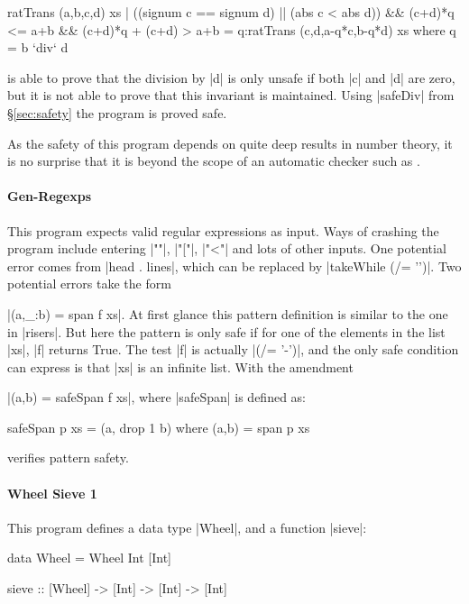 \begin{code}
ratTrans (a,b,c,d) xs |
  ((signum c == signum d) || (abs c < abs d)) &&
  (c+d)*q <= a+b && (c+d)*q + (c+d) > a+b
     = q:ratTrans (c,d,a-q*c,b-q*d) xs
  where q = b `div` d
\end{code}

\noindent \catch{} is able to prove that the division by |d| is only unsafe if both |c| and |d| are zero, but it is not able to prove that this invariant is maintained. Using |safeDiv| from \S\ref{sec:safety} the program is proved safe.

As the safety of this program depends on quite deep results in number theory, it is no surprise that it is beyond the scope of an automatic checker such as \catch{}.

\paragraph{Gen-Regexps}

This program expects valid regular expressions as input. Ways of crashing the program include entering |""|, |"["|, |"<"| and lots of other inputs. One potential error comes from |head . lines|, which can be replaced by |takeWhile (/= '\n')|. Two potential errors take the form \ignore|(a,_:b) = span f xs|. At first glance this pattern definition is similar to the one in |risers|. But here the pattern is only safe if for one of the elements in the list |xs|, |f| returns True. The test |f| is actually |(/= '-')|, and the only safe condition \catch{} can express is that |xs| is an infinite list. With the amendment  \ignore|(a,b) = safeSpan f xs|, where |safeSpan| is defined as:

\begin{code}
safeSpan p xs = (a, drop 1 b) where (a,b) = span p xs
\end{code}

\noindent \catch{} verifies pattern safety.

\paragraph{Wheel Sieve 1}

This program defines a data type |Wheel|, and a function |sieve|:

\begin{code}
data Wheel = Wheel Int [Int]

sieve :: [Wheel] -> [Int] -> [Int] -> [Int]
\end{code}

